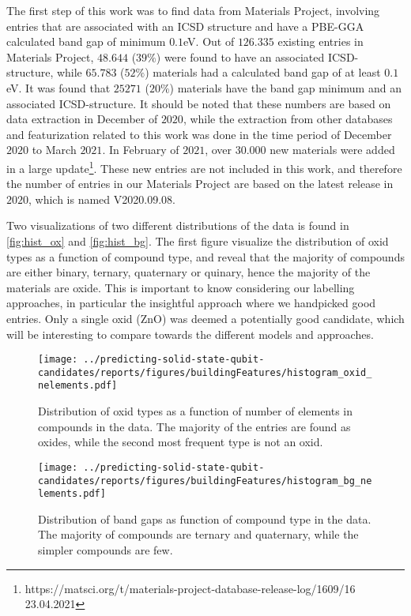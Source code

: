 The first step of this work was to find data from Materials Project, involving entries that are associated with an ICSD structure and have a PBE-GGA calculated band gap of minimum $0.1$eV. Out of $126.335$ existing entries in Materials Project, $48.644$ ($39\%$) were found to have an associated ICSD-structure, while $65.783$ ($52\%$) materials had a calculated band gap of at least $0.1$eV. It was found that $25271$ ($20\%$) materials have the band gap minimum and an associated ICSD-structure. It should be noted that these numbers are based on data extraction in December of $2020$, while the extraction from other databases and featurization related to this work was done in the time period of December $2020$ to March $2021$. In February of $2021$, over $30.000$ new materials were added in a large update\footnote{https://matsci.org/t/materials-project-database-release-log/1609/16 23.04.2021}. These new entries are not included in this work, and therefore the number of entries in our Materials Project are based on the latest release in $2020$, which is named V2020.09.08.%

Two visualizations of two different distributions of the data is found in \autoref{fig:hist_ox} and \autoref{fig:hist_bg}. The first figure visualize the distribution of oxid types as a function of compound type, and reveal that the majority of compounds are either binary, ternary, quaternary or quinary, hence the majority of the materials are oxide. This is important to know considering our labelling approaches, in particular the insightful approach where we handpicked good entries. Only a single oxid (ZnO) was deemed a potentially good candidate, which will be interesting to compare towards the different models and approaches.

\clearpage

\begin{figure}
      \centering
      \texttt{[image: ../predicting-solid-state-qubit-candidates/reports/figures/buildingFeatures/histogram\_oxid\_nelements.pdf]}
      \vspace*{-130mm}
      \caption{Distribution of oxid types as a function of number of elements in compounds in the data. The majority of the entries are found as oxides, while the second most frequent type is not an oxid. }
      \label{fig:hist_ox}
\end{figure}

\begin{figure}
      \centering
      \texttt{[image: ../predicting-solid-state-qubit-candidates/reports/figures/buildingFeatures/histogram\_bg\_nelements.pdf]}
      \vspace*{-130mm}
      \caption{Distribution of band gaps as function of compound type in the data. The majority of compounds are ternary and quaternary, while the simpler compounds are few.}
      \label{fig:hist_bg}
\end{figure}

